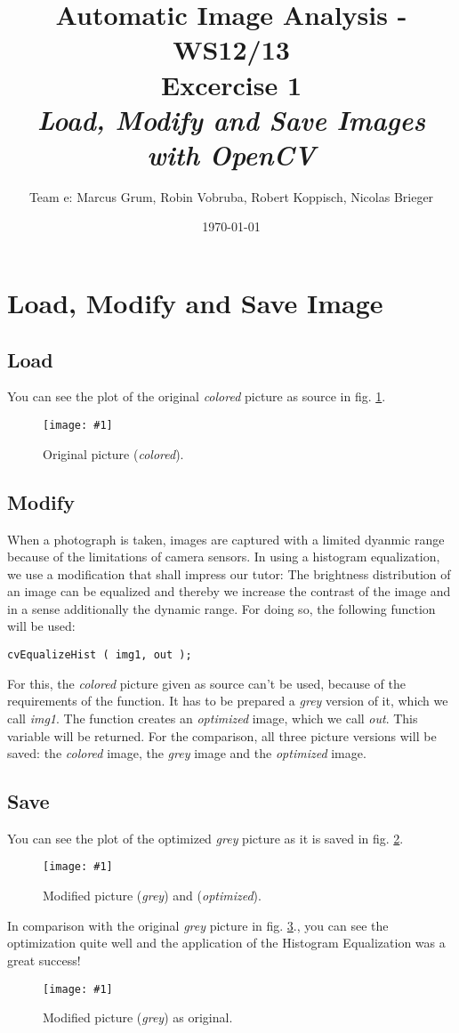 \documentclass[a4paper,headings=small]{scrartcl}
\title{Automatic Image Analysis - WS12/13 \\ Excercise 1 \\ \emph{Load, Modify and Save Images with OpenCV}}
\author{Team e: Marcus Grum, Robin Vobruba, Robert Koppisch, Nicolas Brieger}
\date{\today}
\numberwithin{equation}{section} %
\numberwithin{figure}{section}   %
\newcommand{\image}[3]{
	\begin{figure}[htbp]
		\centering
		\texttt{[image: \#1]}
		\caption{#3}
		\label{fig:#1}
	\end{figure}
}
\begin{document}
\maketitle



\section{Load, Modify and Save Image}


\subsection{Load}

You can see the plot of the original \emph{colored} picture as source
in fig. \ref{fig:../../../target/input}.

\image{../../../target/input}{0.5}{%
		Original picture (\emph{colored}).}



\subsection{Modify}


When a photograph is taken, images are captured with a limited dyanmic range because of 
the limitations of camera sensors. In using a histogram equalization, 
we use a modification that shall impress our tutor:
The brightness distribution of an image can be equalized and 
thereby we increase the contrast of the image and in a sense additionally the dynamic range.
For doing so, the following function will be used:
\begin{lstlisting}
cvEqualizeHist ( img1, out );
\end{lstlisting}
For this, the \emph{colored} picture given as source can't be used,
because of the requirements of the function. It has to be prepared a \emph{grey} version of it,
which we call \emph{img1}. The function creates an \emph{optimized} image, which we call \emph{out}.
This variable will be returned.
For the comparison, all three picture versions will be saved: 
the \emph{colored} image, 
the \emph{grey} image and
the \emph{optimized} image.


\subsection{Save}

You can see the plot of the optimized \emph{grey} picture as it is saved 
in fig. \ref{fig:../../../target/result_grey_optimized}.

\image{../../../target/result_grey_optimized}{0.5}{%
		Modified picture (\emph{grey}) and (\emph{optimized}).}

\newpage

In comparison with the original \emph{grey} picture in fig. \ref{fig:../../../target/result_grey}., you can see the optimization quite well and the application of the Histogram Equalization was a great success! 

\image{../../../target/result_grey}{0.5}{%
		Modified picture (\emph{grey}) as original.}
\end{document}
